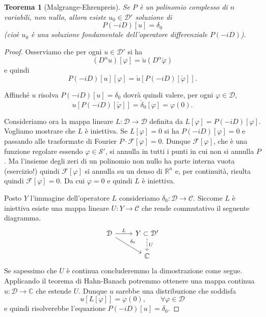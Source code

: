 \documentclass[italian,a4paper,oneside,headinclude]{scrbook}
\renewcommand{\phi}{\varphi}
\newcommand{\C}{\mathcal C}
\newcommand{\D}{\mathcal D}
\newcommand{\F}{\mathcal F}
\renewcommand{\S}{\mathcal S}
\newcommand{\CC}{\mathbb C}
\newcommand{\RR}{\mathbb R}
\newcommand{\abs}[1]{{\left|#1\right|}}
\newtheorem{theorem}{Teorema}
\begin{document}
\begin{theorem}[Malgrange-Ehrenpreis]\label{th:malgrange}
  Se $P$ è un polinomio complesso di $n$ variabili, non nullo,
  allora
  esiste $u_0\in \D'$ soluzione di
  \[
  P(-iD)[u] = \delta_0
  \]
  (cioè $u_0$ è una soluzione fondamentale dell'operatore
  differenziale $P(-iD)$).
\end{theorem}
%
\begin{proof}
  Osserviamo che per ogni $u\in\D'$ si ha
  \[
    (D^\alpha u)[\phi] =\check u(D^\alpha \check \phi)
  \]
  e quindi
  \[
  P(-iD)[u][\phi] = \check u[P(-iD)[\check \phi]].
  \]

  Affinché $u$ risolva $P(-iD)[u] = \delta_0$ dovrà quindi valere, per
  ogni $\phi \in \D$,
  \[
    u[P(-iD)[\check\phi]] = \check \delta_0[\phi] = \phi(0).
  \]

  Consideriamo ora la mappa lineare $L\colon \D \to \D$
  definita da $L[\phi] = P(-iD)[\phi]$.
  Vogliamo mostrare che $L$ è iniettiva.
  Se $L[\phi] = 0$ si ha $P(-iD)[\phi] = 0$
  e passando alle trasformate di Fourier
  $P\cdot \F[\phi] = 0$. Dunque $\F[\phi]$, che è una funzione
  regolare essendo $\phi\in \S'$, si annulla in tutti i punti in cui
  non si annulla $P$. Ma l'insieme degli zeri di un polinomio non
  nullo ha parte interna vuota (esercizio!) quindi $\F[\phi]$ si
  annulla su un denso di $\RR^n$ e, per continuità, risulta quindi
  $\F[\phi]=0$. Da cui $\phi=0$ e quindi $L$ è iniettiva.

  Posto $Y$ l'immagine dell'operatore $L$ consideriamo $\delta_0\colon \D \to \C$.
  Siccome $L$ è iniettiva esiste una mappa lineare $U\colon Y \to \C$
  che rende commutativo il seguente diagramma.
  \[
  \begin{tikzcd}
    \D \arrow[rd, "\delta_0"] \arrow[r, "L"] & Y \subset \D'\arrow[d, dashed, "U"]\\
    & \CC
  \end{tikzcd}
  \]
  Se sapessimo che $U$ è continua concluderemmo la dimostrazione come
  segue. Applicando il teorema di Hahn-Banach potremmo ottenere una
  mappa continua $u\colon \D\to \CC$ che estende $U$. Dunque $u$ sarebbe una
  distribuzione che soddisfa
  \[
  u[L[\phi]]= \phi(0), \qquad \forall\phi\in\D
  \]
  e quindi risolverebbe l'equazione $P(-iD)[u]=\delta_0$.


\end{proof}
\end{document}
